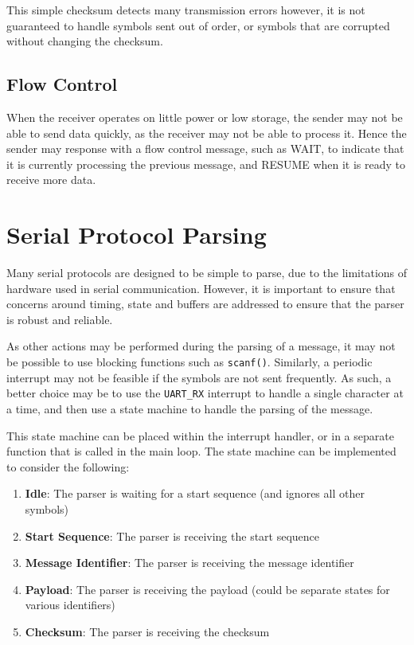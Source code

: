 \documentclass[a4paper]{report}
\begin{document}
This simple checksum detects many transmission errors however, it is not guaranteed to handle
symbols sent out of order, or symbols that are corrupted without changing the checksum.
\subsection{Flow Control}
When the receiver operates on little power or low storage, the sender may
not be able to send data quickly, as the receiver may not be able to process it.
Hence the sender may response with a flow control message, such as WAIT, to indicate that it
is currently processing the previous message, and RESUME when it is ready to receive more data.
\section{Serial Protocol Parsing}
Many serial protocols are designed to be simple to parse, due to the limitations of hardware used in serial
communication. However, it is important to ensure that concerns around timing, state and buffers are
addressed to ensure that the parser is robust and reliable.

As other actions may be performed during the parsing of a message, it may not be possible to use
blocking functions such as \texttt{scanf()}. Similarly, a periodic interrupt may not be feasible
if the symbols are not sent frequently. As such, a better choice may be to use the \texttt{UART_RX}
interrupt to handle a single character at a time, and then use a state machine to handle the
parsing of the message.

This state machine can be placed within the interrupt handler, or in a separate function that is
called in the main loop. The state machine can be implemented to consider the following:
\begin{enumerate}
    \item \textbf{Idle}: The parser is waiting for a start sequence (and ignores all other symbols)
    \item \textbf{Start Sequence}: The parser is receiving the start sequence
    \item \textbf{Message Identifier}: The parser is receiving the message identifier
    \item \textbf{Payload}: The parser is receiving the payload (could be separate states for various identifiers)
    \item \textbf{Checksum}: The parser is receiving the checksum
\end{enumerate}
\end{document}
